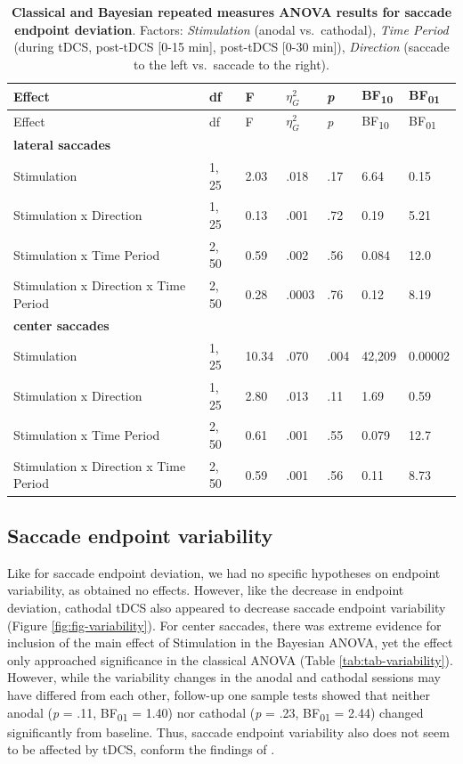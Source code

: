 \documentclass[11pt,]{memoir}
\begin{document}
\begin{longtable}[]{@{}lllllll@{}}
\caption{\label{tab:tab-deviation} \textbf{Classical and Bayesian repeated measures ANOVA results for saccade endpoint deviation}. Factors: \emph{Stimulation} (anodal vs.~cathodal), \emph{Time Period} (during tDCS, post-tDCS {[}0-15 min{]}, post-tDCS {[}0-30 min{]}), \emph{Direction} (saccade to the left vs.~saccade to the right).}\tabularnewline
\toprule
Effect & df & F & \(\eta_{G}^{2}\) & \emph{p} & BF\textsubscript{10} & BF\textsubscript{01}\tabularnewline
\midrule
\endfirsthead
\toprule
Effect & df & F & \(\eta_{G}^{2}\) & \emph{p} & BF\textsubscript{10} & BF\textsubscript{01}\tabularnewline
\midrule
\endhead
\textbf{lateral saccades} & & & & & &\tabularnewline
Stimulation & 1, 25 & 2.03 & .018 & .17 & 6.64 & 0.15\tabularnewline
Stimulation x Direction & 1, 25 & 0.13 & .001 & .72 & 0.19 & 5.21\tabularnewline
Stimulation x Time Period & 2, 50 & 0.59 & .002 & .56 & 0.084 & 12.0\tabularnewline
Stimulation x Direction x Time Period & 2, 50 & 0.28 & .0003 & .76 & 0.12 & 8.19\tabularnewline
\textbf{center saccades} & & & & & &\tabularnewline
Stimulation & 1, 25 & 10.34 & .070 & .004 & 42,209 & 0.00002\tabularnewline
Stimulation x Direction & 1, 25 & 2.80 & .013 & .11 & 1.69 & 0.59\tabularnewline
Stimulation x Time Period & 2, 50 & 0.61 & .001 & .55 & 0.079 & 12.7\tabularnewline
Stimulation x Direction x Time Period & 2, 50 & 0.59 & .001 & .56 & 0.11 & 8.73\tabularnewline
\bottomrule
\end{longtable}

\endgroup

\hypertarget{saccade-endpoint-variability}{%
\subsection{Saccade endpoint variability}\label{saccade-endpoint-variability}}

Like for saccade endpoint deviation, we had no specific hypotheses on endpoint variability, as \textcite{Kanai2012} obtained no effects. However, like the decrease in endpoint deviation, cathodal tDCS also appeared to decrease saccade endpoint variability (Figure \ref{fig:fig-variability}). For center saccades, there was extreme evidence for inclusion of the main effect of Stimulation in the Bayesian ANOVA, yet the effect only approached significance in the classical ANOVA (Table \ref{tab:tab-variability}). However, while the variability changes in the anodal and cathodal sessions may have differed from each other, follow-up one sample tests showed that neither anodal (\emph{p} = .11, BF\textsubscript{01} = 1.40) nor cathodal (\emph{p} = .23, BF\textsubscript{01} = 2.44) changed significantly from baseline. Thus, saccade endpoint variability also does not seem to be affected by tDCS, conform the findings of \textcite{Kanai2012}.
\end{document}

